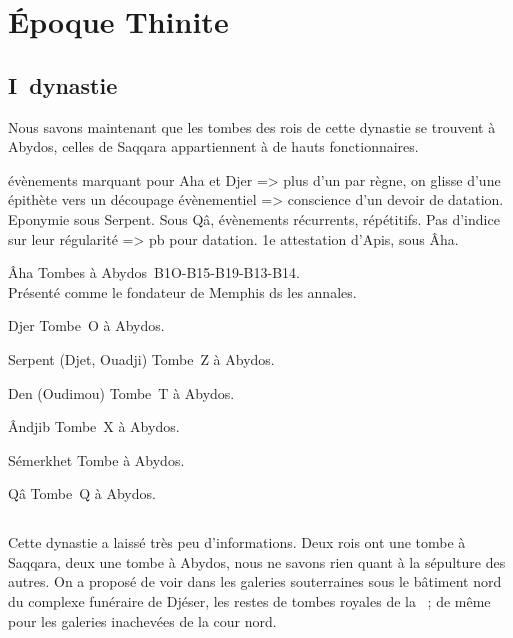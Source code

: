\section{\'Epoque Thinite}


\subsection{I\iere~dynastie}

Nous savons maintenant que les tombes des rois de cette dynastie 
se trouvent à Abydos, celles de Saqqara appartiennent à de hauts 
fonctionnaires.

évènements marquant pour Aha et Djer => plus d'un par règne, on 
glisse d'une épithète vers un découpage évènementiel => conscience 
d'un devoir de datation.
Eponymie sous Serpent.
Sous Qâ, évènements récurrents, répétitifs.
Pas d'indice sur leur régularité => pb pour datation.
1e attestation d'Apis, sous Âha.

\begin{listerois}
  \item [\^Aha] Tombes à Abydos~B1O-B15-B19-B13-B14.\\
        Présenté comme le fondateur de Memphis ds les annales.
  \item [Djer] Tombe~O à Abydos.
  \item [Serpent (Djet, Ouadji)] Tombe~Z à Abydos.
  \item [Den (Oudimou)] Tombe~T à Abydos.
  \item [\^Andjib] Tombe~X à Abydos.
  \item [Sémerkhet] Tombe à Abydos.
  \item [Qâ] Tombe~Q à Abydos.
\end{listerois}

\subsection{\texorpdfstring{}{IIe dynastie}}

Cette dynastie a laissé très peu d'informations. Deux rois ont une 
tombe à Saqqara, deux une tombe à Abydos, nous ne savons rien quant à 
la sépulture des autres. On a proposé de voir dans les galeries 
souterraines sous le bâtiment nord du complexe funéraire de Djéser, 
les restes de tombes royales de la~ ; de même pour les 
galeries inachevées de la cour nord.

\noi{}

